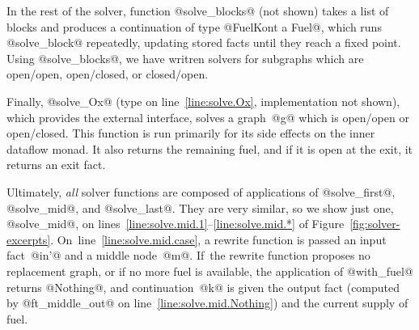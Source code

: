 \documentclass[blockstyle,preprint,natbib,nocopyrightspace]{sigplanconf}
\newcommand\lineref[1]{line~\ref{line:#1}}
\newcommand\linerangeref[2]{\mbox{lines~\ref{line:#1}--\ref{line:#2}}}
\newcommand\figref[1]{Figure~\ref{fig:#1}}
\begin{document}
In the rest of the solver,
function @solve_blocks@ (not shown) takes a list of blocks and
produces a continuation of type @FuelKont a Fuel@, which
runs @solve_block@ repeatedly,
updating stored facts until they reach a
fixed point.
Using @solve_blocks@, we have writren solvers for subgraphs which are open/open,
open/closed, or closed/open.

Finally, @solve_Ox@ (type on \lineref{solve.Ox}, implementation not
shown), which provides the external interface, 
solves a graph~@g@ which is open/open or open/closed.
This function is run primarily for its
side effects on the inner
dataflow monad.
It also returns the remaining fuel, and if it is open at the exit, it
returns an exit fact.

Ultimately, \emph{all} solver functions
are composed of applications of @solve_first@,
@solve_mid@, and @solve_last@.
They are very similar, so we show just one,
@solve_mid@, on
\linerangeref{solve.mid.1}{solve.mid.*} of \figref{solver-excerpts}.
On~\lineref{solve.mid.case}, a rewrite function is passed an
input fact~@in'@ and a middle node~@m@.
If~the rewrite function proposes no replacement graph, 
or if no more fuel is available, the application of @with_fuel@
returns @Nothing@, and continuation~@k@ is given the output fact
(computed by @ft_middle_out@ on \lineref{solve.mid.Nothing}) and
the current supply of fuel.
\end{document}
